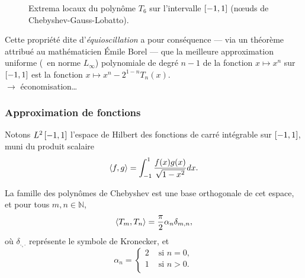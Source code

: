 \begin{figure}
	\centering
	
	\caption{Extrema locaux du polynôme $T_6$ sur l'intervalle $\left[ -1, 1 \right]$ (n\oe uds de Chebyshev-Gauss-Lobatto).}
	\label{fig:cgl_nodes}
\end{figure}

Cette propriété dite d'\emph{équioscillation} a pour conséquence --- via un théorème attribué au mathématicien Émile Borel --- que la meilleure approximation uniforme (\ie\ en norme $L_\infty$) polynomiale de degré $n - 1$ de la fonction $x \mapsto x^n$ sur $\left[ -1, 1 \right]$ est la fonction $x \mapsto x^n - 2^{1 - n} T_n(x)$. \\
$\to$ économisation\ldots


\subsubsection{Approximation de fonctions}
Notons $L^2\left[ -1, 1 \right]$ l'espace de Hilbert des fonctions de carré intégrable sur $\left[ -1, 1 \right]$, muni du produit scalaire
\begin{equation}
	\left \langle {f}, {g} \right \rangle =
	\int_{-1}^{1} \frac{f(x) g(x)}{\sqrt{1 - x^2}} dx.
	\label{eq:chebyshev_scalar_product}
\end{equation}

La famille des polynômes de Chebyshev est une base orthogonale de cet espace, et pour tous $m,n \in \mathbb{N}$,
\begin{equation}
	\left \langle {T_m}, {T_n} \right \rangle =
	\frac{\pi}{2} \alpha_n \delta_{m,n},
	\label{eq:chebyshev_orthogonality}
\end{equation}
où $\delta_{\cdot,\cdot}$ représente le symbole de Kronecker, et
\begin{equation}
	\alpha_n = 
	\begin{cases}
	 2 & \text{\ si\ } n = 0,   \\ 
	 1 & \text{\ si\ } n > 0.\\ 
	\end{cases}
\end{equation}

